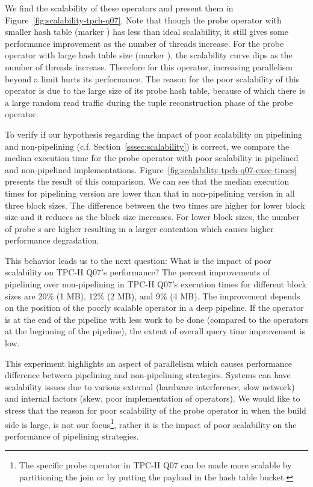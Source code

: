 We find the scalability of these operators and present them in Figure~\ref{fig:scalability-tpch-q07}.
Note that though the probe operator with smaller hash table (marker {\color{PlotOrange}\FilledSmallCircle}) has less than ideal scalability, it still gives some performance improvement as the number of threads increase.
For the probe operator with large hash table size (marker {\color{PlotGreen}\FilledSmallTriangleUp}), the scalability curve dips as the number of threads increase.
Therefore for this operator, increasing parallelism beyond a limit hurts its performance. 
The reason for the poor scalability of this operator is due to the large size of its probe hash table, because of which there is a large random read traffic during the tuple reconstruction phase of the probe operator. 

To verify if our hypothesis regarding the impact of poor scalability on pipelining and non-pipelining (c.f. Section~\ref{sssec:scalability}) is correct, we compare the median \wo{} execution time for the probe operator with poor scalability in pipelined and non-pipelined implementations.
Figure~\ref{fig:scalability-tpch-q07-exec-times} presents the result of this comparison. 
We can see that the median execution times for pipelining version are lower than that in non-pipelining version in all three block sizes.
The difference between the two times are higher for lower block size and it reduces as the block size increases.
For lower block sizes, the number of probe \wo{}s are higher resulting in a larger contention which causes higher performance degradation.

This behavior leads us to the next question: What is the impact of poor scalability on TPC-H Q07's performance?
The percent improvements of pipelining over non-pipelining in TPC-H Q07's execution times for different block sizes are 20\% (1 MB), 12\% (2 MB), and 9\% (4 MB).
The improvement depends on the position of the poorly scalable operator in a deep pipeline.
If the operator is at the end of the pipeline with less work to be done (compared to the operators at the beginning of the pipeline), the extent of overall query time improvement is low. 

This experiment highlights an aspect of parallelism which causes performance difference between pipelining and non-pipelining strategies.
Systems can have scalability issues due to various external (hardware interference, slow network) and internal factors (skew, poor implementation of operators).
We would like to stress that the reason for poor scalability of the probe operator in \sys{} when the build side is large, is not our focus\footnote{The specific probe operator in TPC-H Q07 can be made more scalable by partitioning the join or by putting the payload in the hash table bucket.}, rather it is the impact of poor scalability on the performance of pipelining strategies.

